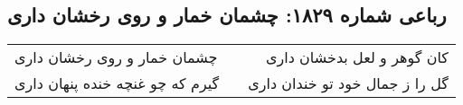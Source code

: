 \begin{center}
\section*{رباعی شماره ۱۸۲۹: چشمان خمار و روی رخشان داری}
\label{sec:1829}
\begin{longtable}{l p{0.5cm} r}
چشمان خمار و روی رخشان داری
&&
کان گوهر و لعل بدخشان داری
\\
گیرم که چو غنچه خنده پنهان داری
&&
گل را ز جمال خود تو خندان داری
\\
\end{longtable}
\end{center}
